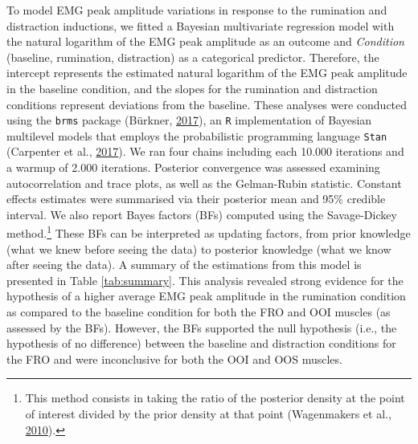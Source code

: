 \documentclass[
  english,
  man, donotrepeattitle,floatsintext]{apa6}
\begin{document}
To model EMG peak amplitude variations in response to the rumination and distraction inductions, we fitted a Bayesian multivariate regression model with the natural logarithm of the EMG peak amplitude as an outcome and \emph{Condition} (baseline, rumination, distraction) as a categorical predictor. Therefore, the intercept represents the estimated natural logarithm of the EMG peak amplitude in the baseline condition, and the slopes for the rumination and distraction conditions represent deviations from the baseline. These analyses were conducted using the \texttt{brms} package (Bürkner, \protect\hyperlink{ref-R-brms}{2017}), an \texttt{R} implementation of Bayesian multilevel models that employs the probabilistic programming language \texttt{Stan} (Carpenter et al., \protect\hyperlink{ref-carpenter_stan_2017}{2017}). We ran four chains including each 10.000 iterations and a warmup of 2.000 iterations. Posterior convergence was assessed examining autocorrelation and trace plots, as well as the Gelman-Rubin statistic. Constant effects estimates were summarised via their posterior mean and 95\% credible interval. We also report Bayes factors (BFs) computed using the Savage-Dickey method.\footnote{This method consists in taking the ratio of the posterior density at the point of interest divided by the prior density at that point (Wagenmakers et al., \protect\hyperlink{ref-wagenmakers_bayesian_2010}{2010}).} These BFs can be interpreted as updating factors, from prior knowledge (what we knew before seeing the data) to posterior knowledge (what we know after seeing the data). A summary of the estimations from this model is presented in Table \ref{tab:summary}. This analysis revealed strong evidence for the hypothesis of a higher average EMG peak amplitude in the rumination condition as compared to the baseline condition for both the FRO and OOI muscles (as assessed by the BFs). However, the BFs supported the null hypothesis (i.e., the hypothesis of no difference) between the baseline and distraction conditions for the FRO and were inconclusive for both the OOI and OOS muscles.
\end{document}
